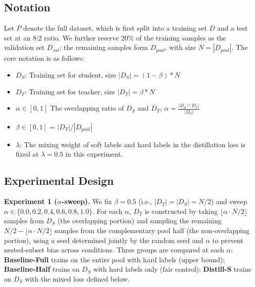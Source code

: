 \documentclass[a4paper,fleqn]{cas-dc}
\begin{document}
\subsection{Notation}

Let $P$ denote the full dataset, which is first split into a training set $D$ and a test set at an 8:2 ratio. We further reserve 20\% of the training samples as the validation set $D_{val}$; the remaining samples form $D_{pool}$, with size $N = |D_{pool}|$. The core notation is as follows:

\begin{itemize}
  \item $D_S$: Training set for student, size $|D_S| = (1-\beta) * N$

  \item $D_T$: Training set for teacher, size $|D_T| = \beta * N$

  \item $\alpha \in [0,1]$ The overlapping ratio of $D_S$ and $D_T$, $\alpha = \frac{|D_S \cap D_T|}{|D_S|}$

  \item $\beta \in [0,1] $ = $|D_T| / |D_{pool}|$

  \item $\lambda$: The mixing weight of soft labels and hard labels in the distillation loss is fixed at $\lambda = 0.5$ in this experiment.


\end{itemize}


\subsection{Experimental Design}

\textbf{Experiment 1 ($\alpha$-sweep).}
We fix $\beta = 0.5$ (i.e., $|D_T|=|D_S|=N/2$) and sweep
$\alpha \in \{0.0, 0.2, 0.4, 0.6, 0.8, 1.0\}$.
For each $\alpha$, $D_T$ is constructed by taking
$\lfloor \alpha \cdot N/2 \rfloor$ samples from $D_S$
(the overlapping portion) and sampling the remaining
$N/2 - \lfloor \alpha \cdot N/2 \rfloor$ samples from the
complementary pool half (the non-overlapping portion),
using a seed determined jointly by the random seed and $\alpha$
to prevent nested-subset bias across conditions.
Three groups are compared at each $\alpha$:
\textbf{Baseline-Full} trains on the entire pool with hard labels
(upper bound);
\textbf{Baseline-Half} trains on $D_S$ with hard labels only
(fair control);
\textbf{Distill-S} trains on $D_S$ with the mixed loss defined below.
\end{document}
